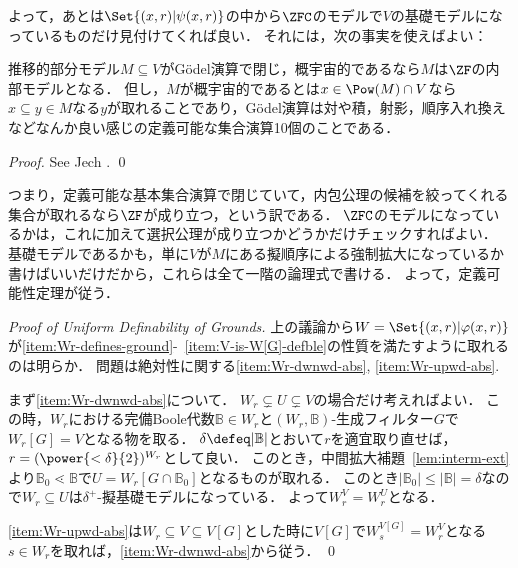 \documentclass[a4j,leqno]{ltjsarticle}
\theoremstyle{nonumberplain}
\begin{document}
よって，あとは$\Set{(x, r) | \psi(x, r)}$の中から$\ZFC$のモデルで$V$の基礎モデルになっているものだけ見付けてくれば良い．
それには，次の事実を使えばよい：
\begin{fact}
 推移的部分モデル$M \subseteq V$がG\"{o}del演算で閉じ，概宇宙的であるなら$M$は$\ZF$の内部モデルとなる．
 但し，$M$が概宇宙的であるとは$x \in \Pow(M) \cap V$なら$x \subseteq y \in M$なる$y$が取れることであり，G\"{o}del演算は対や積，射影，順序入れ換えなどなんか良い感じの定義可能な集合演算10個のことである．
\end{fact}
\begin{proof}
 See Jech \cite[Theorem 13.9]{Jech:2002}. \qed
\end{proof}
つまり，定義可能な基本集合演算で閉じていて，内包公理の候補を絞ってくれる集合が取れるなら$\ZF$が成り立つ，という訳である．
$\ZFC$のモデルになっているかは，これに加えて選択公理が成り立つかどうかだけチェックすればよい．
基礎モデルであるかも，単に$V$が$M$にある擬順序による強制拡大になっているか書けばいいだけだから，これらは全て一階の論理式で書ける．
よって，定義可能性定理が従う．
\begin{proof}[Proof of Uniform Definability of Grounds]
 上の議論から$W = \Set{ (x, r) | \varphi(x, r)}$が\ref{item:Wr-defines-ground}-~\ref{item:V-is-W[G]-defble}の性質を満たすように取れるのは明らか．
 問題は絶対性に関する\ref{item:Wr-dwnwd-abs}, \ref{item:Wr-upwd-abs}.

 まず\ref{item:Wr-dwnwd-abs}について．
 $W_r \subsetneq U \subsetneq V$の場合だけ考えればよい．
 この時，$W_r$における完備Boole代数$\mathbb{B} \in W_r$と$(W_r, \mathbb{B})$-生成フィルター$G$で$W_r[G] = V$となる物を取る．
 $\delta \defeq |\mathbb{B}|$とおいて$r$を適宜取り直せば，$r = (\power{<\delta}{2})^{W_r}$として良い．
 このとき，中間拡大補題~\ref{lem:interm-ext}より$\mathbb{B}_0 \lessdot \mathbb{B}$で$U = W_r[G \cap \mathbb{B}_0]$となるものが取れる．
 このとき$|\mathbb{B}_0| \leq |\mathbb{B}| = \delta$なので$W_r \subseteq U$は$\delta^+$-擬基礎モデルになっている．
 よって$W_r^V = W_r^U$となる．

 \ref{item:Wr-upwd-abs}は$W_r \subseteq V \subseteq V[G]$とした時に$V[G]$で$W_s^{V[G]} = W_r^V$となる$s \in W_r$を取れば，\ref{item:Wr-dwnwd-abs}から従う． \qed
\end{proof}

\nocite{Fuchs:2014fj,Usuba:2017fp,Reitz:2007af}
\printbibliography[title=参考文献]
\end{document}
